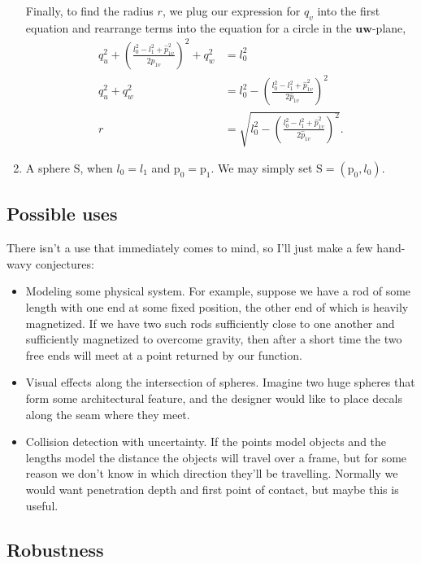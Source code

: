 \documentclass{article}
\newcommand{\mPoint}[1]{\mathrm{#1}}
\newcommand{\mPt}[1]{\mPoint{#1}}
\newcommand{\mVector}[1]{\mathbf{#1}}
\newcommand{\mVc}[1]{\mVector{#1}}
\newcommand{\mCompound}[1]{\mathrm{#1}}
\begin{document}
\begin{enumerate}
  Finally, to find the radius $r$, we plug our expression for $q_v$ into the
  first equation and rearrange terms into the equation for a circle in the
  $\mVc{u}\mVc{w}$-plane,
  \begin{align}
  q_u^2 + \left(\frac{l_0^2-l_1^2+\hat{p}_{1v}^2}{2\hat{p}_{1v}}\right)^2
  + q_w^2 &= l_0^2 \\
  q_u^2 + q_w^2 &= l_0^2 -
  \left(\frac{l_0^2-l_1^2+\hat{p}_{1v}^2}{2\hat{p}_{1v}}\right)^2 \\
  r &= \sqrt{l_0^2 -
  \left(\frac{l_0^2-l_1^2+\hat{p}_{1v}^2}{2\hat{p}_{1v}}\right)^2}.
  \end{align}
  \item A sphere $\mCompound{S}$, when $l_0 = l_1$ and $\mPt{p_0} = \mPt{p_1}$.
  We may simply set $\mCompound{S} = (\mPt{p_0}, l_0)$.
\end{enumerate}

\subsection{Possible uses}

There isn't a use that immediately comes to mind, so I'll just make a few
hand-wavy conjectures:

\begin{itemize}
  \item Modeling some physical system. For example, suppose we have a rod of
  some length with one end at some fixed position, the other end of which is
  heavily magnetized. If we have two such rods sufficiently close to one
  another and sufficiently magnetized to overcome gravity, then after a short
  time the two free ends will meet at a point returned by our function.
  \item Visual effects along the intersection of spheres. Imagine two huge
  spheres that form some architectural feature, and the designer would like to
  place decals along the seam where they meet.
  \item Collision detection with uncertainty. If the points model objects and
  the lengths model the distance the objects will travel over a frame, but for
  some reason we don't know in which direction they'll be travelling. Normally
  we would want penetration depth and first point of contact, but maybe this is 
  useful. 
\end{itemize} 

\subsection{Robustness}
\end{document}
